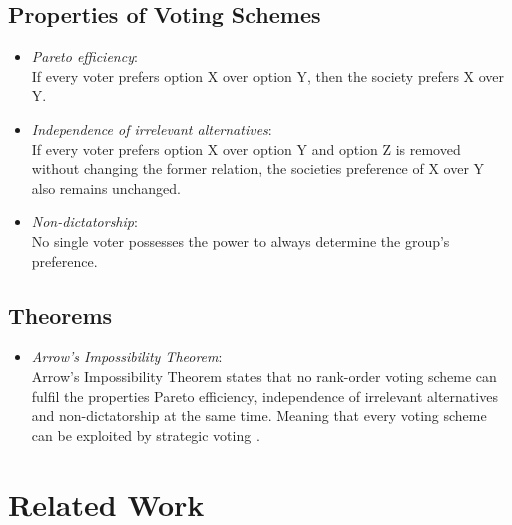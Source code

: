 \documentclass[conference]{IEEEtran}
\begin{document}
\subsection{Properties of Voting Schemes}
\begin{itemize}
    \item \textit{Pareto efficiency}:\\
    If every voter prefers option X over option Y, then the society prefers X over Y.
    \item \textit{Independence of irrelevant alternatives}:\\
    If every voter prefers option X over option Y and option Z is removed without changing the former relation, the societies preference of X over Y also remains unchanged.
    \item \textit{Non-dictatorship}:\\
    No single voter possesses the power to always determine the group's preference.
\end{itemize}

\subsection{Theorems}
\begin{itemize}
    \item \textit{Arrow's Impossibility Theorem}\cite{arrow2012social}:\\
    Arrow's Impossibility Theorem states that no rank-order voting scheme can fulfil the properties Pareto efficiency, independence of irrelevant alternatives and non-dictatorship at the same time.
    Meaning that every voting scheme can be exploited by strategic voting \cite{pitt2006voting}.
\end{itemize}


\section{Related Work}\label{3RelatedWork}
\end{document}
